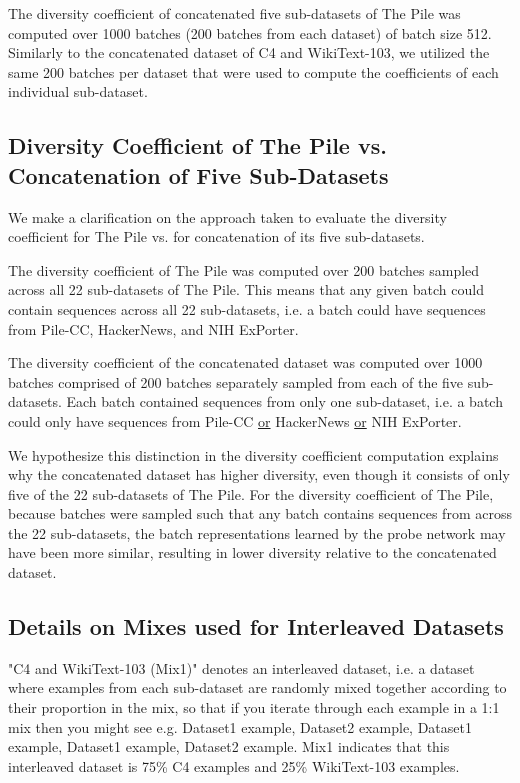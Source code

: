 The diversity coefficient of concatenated five sub-datasets of The Pile was computed over 1000 batches (200 batches from each dataset) of batch size 512. 
Similarly to the concatenated dataset of C4 and WikiText-103, we utilized the same 200 batches per dataset that were used to compute the coefficients of each individual sub-dataset.


\subsection{Diversity Coefficient of The Pile vs. Concatenation of Five Sub-Datasets}
We make a clarification on the approach taken to evaluate the diversity coefficient for The Pile vs. for concatenation of its five sub-datasets. 

The diversity coefficient of The Pile was computed over 200 batches sampled across all 22 sub-datasets of The Pile.
This means that any given batch could contain sequences across all 22 sub-datasets, i.e. a batch could have sequences from Pile-CC, HackerNews, and NIH ExPorter.

The diversity coefficient of the concatenated dataset was computed over 1000 batches comprised of 200 batches separately sampled from each of the five sub-datasets. 
Each batch contained sequences from only one sub-dataset, i.e. a batch could only have sequences from Pile-CC \underline{or} HackerNews \underline{or} NIH ExPorter.

We hypothesize this distinction in the diversity coefficient computation explains why the concatenated dataset has higher diversity, even though it consists of only five of the 22 sub-datasets of The Pile. 
For the diversity coefficient of The Pile, because batches were sampled such that any batch contains sequences from across the 22 sub-datasets, the batch representations learned by the probe network may have been more similar, resulting in lower diversity relative to the concatenated dataset.

\subsection{Details on Mixes used for Interleaved Datasets}
\label{appendix:mixdetails}

"C4 and WikiText-103 (Mix1)" denotes an interleaved dataset, i.e. a dataset where examples from each sub-dataset are randomly mixed together according to their proportion in the mix, so that if you iterate through each example in a 1:1 mix then you might see e.g. Dataset1 example, Dataset2 example, Dataset1 example, Dataset1 example, Dataset2 example. Mix1 indicates that this interleaved dataset is 75\% C4 examples and 25\% WikiText-103 examples.\\

